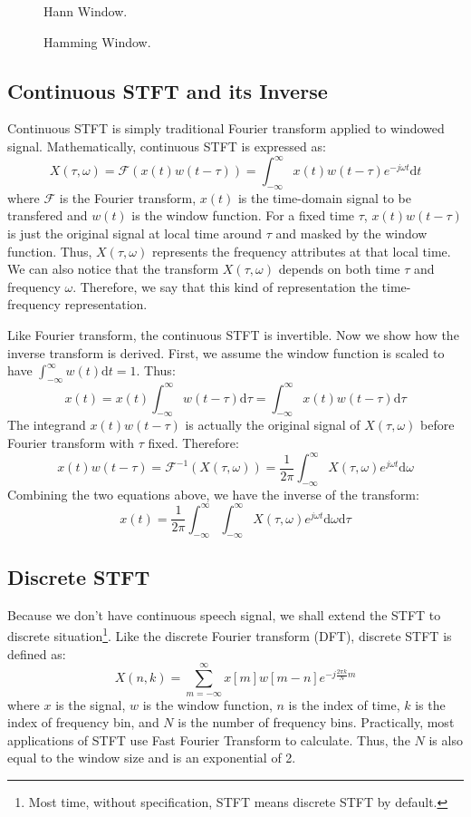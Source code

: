 \documentclass[11pt,a4paper]{report}
\begin{document}
\begin{figure}[htbp]
  \centering
  
  \caption[Hann Window]{Hann Window.}
  \label{fig:hann}
\end{figure}

\begin{figure}[htbp]
  \centering
  
  \caption[Hamming Window]{Hamming Window.}
  \label{fig:hamming}
\end{figure}

\subsection{Continuous STFT and its Inverse}
Continuous STFT is simply traditional Fourier transform applied to windowed signal. Mathematically, continuous STFT is expressed as:
\[ X(\tau, \omega) = \mathcal{F}(x(t)w(t-\tau)) =  \int_{-\infty}^{\infty} x(t)w(t-\tau)e^{-j\omega t}\mathrm{d}t \]
where $\mathcal{F}$ is the Fourier transform, $x(t)$ is the time-domain signal to be transfered and $w(t)$ is the window function. For a fixed time $\tau$, $x(t)w(t-\tau)$ is just the original signal at local time around $\tau$ and masked by the window function. Thus, $X(\tau, \omega)$ represents the frequency attributes at that local time. We can also notice that the transform $X(\tau, \omega)$ depends on both time $\tau$ and frequency $\omega$. Therefore, we say that this kind of representation the time-frequency representation.

Like Fourier transform, the continuous STFT is invertible. Now we show how the inverse transform is derived. First, we assume the window function is scaled to have $\int_{-\infty}^{\infty} w(t) \mathrm{d}t = 1$. Thus:
\[
  x(t) = x(t) \int_{-\infty}^{\infty} w(t-\tau) \mathrm{d}\tau = \int_{-\infty}^{\infty} x(t)w(t-\tau) \mathrm{d}\tau
\]
The integrand $x(t)w(t-\tau)$ is actually the original signal of $X(\tau, \omega)$ before Fourier transform with $\tau$ fixed. Therefore:
\[ x(t)w(t-\tau) = \mathcal{F}^{-1}(X(\tau, \omega)) = \frac{1}{2\pi} \int_{-\infty}^{\infty} X(\tau, \omega) e^{j\omega t} \mathrm{d}\omega \]
Combining the two equations above, we have the inverse of the transform:
\[ x(t) = \frac{1}{2\pi} \int_{-\infty}^{\infty} \int_{-\infty}^{\infty} X(\tau, \omega) e^{j\omega t} \mathrm{d}\omega \mathrm{d}\tau \]

\subsection{Discrete STFT}
Because we don't have continuous speech signal, we shall extend the STFT to discrete situation\footnote{Most time, without specification, STFT means discrete STFT by default.}. Like the discrete Fourier transform (DFT), discrete STFT is defined as:
\[ X(n, k) = \sum_{m = -\infty}^{\infty} x[m]w[m-n]e^{-j \frac{2\pi k}{N} m} \]
where $x$ is the signal, $w$ is the window function, $n$ is the index of time, $k$ is the index of frequency bin, and $N$ is the number of frequency bins. Practically, most applications of STFT use Fast Fourier Transform to calculate. Thus, the $N$ is also equal to the window size and is an exponential of 2.
\end{document}
